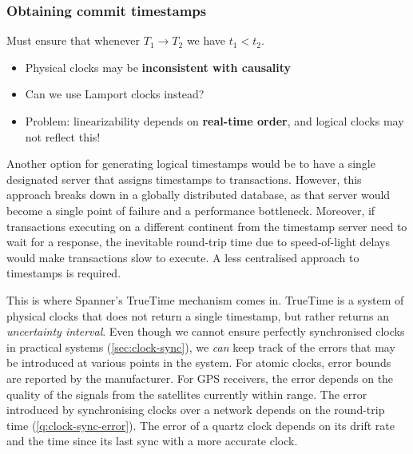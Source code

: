 \begin{frame}
    \label{s:commit-timestamps}
    \frametitle{Obtaining commit timestamps}
    Must ensure that whenever $T_1 \rightarrow T_2$ we have $t_1 < t_2$.
    \begin{itemize}
        \item Physical clocks may be \textbf{inconsistent with causality}\pause
        \item Can we use Lamport clocks instead?
        \item Problem: linearizability depends on \textbf{real-time order}, and logical clocks may not reflect this!\pause
    \end{itemize}
    \begin{center}
    \end{center}%
\end{frame}
\label{l:commit-timestamps}

Another option for generating logical timestamps would be to have a single designated server that assigns timestamps to transactions.
However, this approach breaks down in a globally distributed database, as that server would become a single point of failure and a performance bottleneck.
Moreover, if transactions executing on a different continent from the timestamp server need to wait for a response, the inevitable round-trip time due to speed-of-light delays would make transactions slow to execute.
A less centralised approach to timestamps is required.

This is where Spanner's TrueTime mechanism comes in.
TrueTime is a system of physical clocks that does not return a single timestamp, but rather returns an \emph{uncertainty interval}.
Even though we cannot ensure perfectly synchronised clocks in practical systems (\autoref{sec:clock-sync}), we \emph{can} keep track of the errors that may be introduced at various points in the system.
For atomic clocks, error bounds are reported by the manufacturer.
For GPS receivers, the error depends on the quality of the signals from the satellites currently within range.
The error introduced by synchronising clocks over a network depends on the round-trip time (\autoref{q:clock-sync-error}).
The error of a quartz clock depends on its drift rate and the time since its last sync with a more accurate clock.

